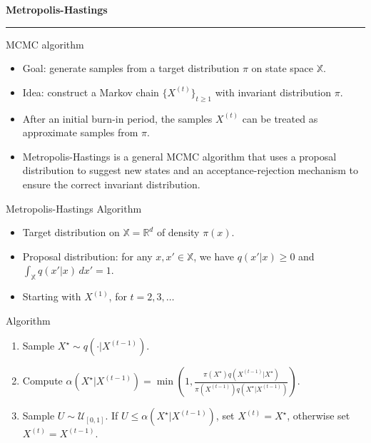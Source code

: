 \begin{frame}
	\vspace{2cm}
	\begin{center}
		{\Huge\textbf{\textcolor{copenhagenred}{Metropolis-Hastings}}}
		\vspace{1cm}

		\rule{4cm}{3pt}
		\vspace{2cm}
	\end{center}
\end{frame}

\begin{frame}{MCMC algorithm}
	\begin{itemize}
		\item Goal: generate samples from a target distribution $\pi$ on state space $\mathbb{X}$.
		\item Idea: construct a Markov chain $\{X^{(t)}\}_{t \geq 1}$ with invariant distribution $\pi$.
		\item After an initial burn-in period, the samples $X^{(t)}$ can be treated as approximate
		samples from $\pi$.
		\item Metropolis-Hastings is a general MCMC algorithm that uses a proposal distribution
		to suggest new states and an acceptance-rejection mechanism to ensure the correct
		invariant distribution.
	\end{itemize}
\end{frame}

\begin{frame}{Metropolis-Hastings Algorithm}
	\begin{itemize}
		\item Target distribution on $\mathbb{X} = \mathbb{R}^d$ of density $\pi(x)$.
		\item Proposal distribution: for any $x, x' \in \mathbb{X}$,
		we have $q(x'|x) \geq 0$ and $\int_{\mathbb{X}} q(x'|x) \, dx' = 1$.
		\item Starting with $X^{(1)}$, for $t = 2, 3, \ldots$
	\end{itemize}
	\begin{block}{Algorithm}
		\begin{enumerate}
			\item Sample $X^{\star} \sim q(\cdot | X^{(t-1)})$.
			\item Compute $\alpha(X^{\star} | X^{(t-1)}) = \min\left(1, \frac{\pi(X^{\star}) q(X^{(t-1)} | X^{\star})}{\pi(X^{(t-1)}) q(X^{\star} | X^{(t-1)})}\right).$
			\item Sample $U \sim \mathcal{U}_{[0,1]}$. If $U \leq \alpha(X^{\star} | X^{(t-1)})$,
			set $X^{(t)} = X^{\star}$, otherwise set $X^{(t)} = X^{(t-1)}$.
		\end{enumerate}
	\end{block}
\end{frame}

